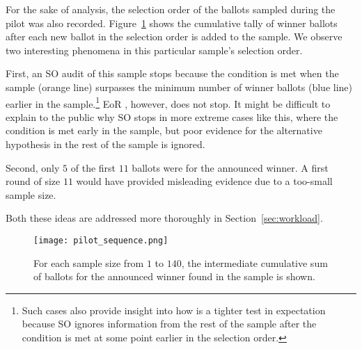 For the sake of analysis, the selection order of the ballots sampled during the pilot was also recorded. Figure~\ref{fig:pilot_sequence} shows the cumulative tally of winner ballots after each new ballot in the selection order is added to the sample. We observe two interesting phenomena in this particular sample's selection order. 
\begin{description}
\item First, an SO \BRAVO audit of this sample stops because the \BRAVO condition is met when the sample (orange line) surpasses the minimum number of winner ballots (blue line) earlier in the sample.\footnote{Such cases also provide insight into how \Providence is a tighter test in expectation because SO \BRAVO ignores information from the rest of the sample after the \BRAVO condition is met at some point earlier in the selection order.} EoR \BRAVO, however, does not stop. It might be difficult to explain to the public why SO \BRAVO stops in more extreme cases like this, where the condition is met early in the sample, but poor evidence for the alternative hypothesis in the rest of the sample is ignored. 
\item Second, only $5$ of the first $11$ ballots were for the announced winner. A first round of size $11$ would have provided misleading evidence due to a too-small sample size. 
\end{description}
Both these ideas are addressed more thoroughly in Section~\ref{sec:workload}.

\begin{figure}
\texttt{[image: pilot\_sequence.png]}
\caption{For each sample size from $1$ to $140$, the intermediate cumulative sum of ballots for the announced winner found in the sample is shown.}
\label{fig:pilot_sequence}
\end{figure}




